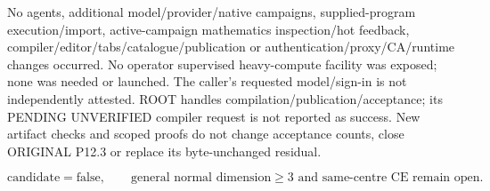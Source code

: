 No agents, additional model/provider/native campaigns, supplied-program execution/import, active-campaign mathematics inspection/hot feedback, compiler/editor/tabs/catalogue/publication or authentication/proxy/CA/runtime changes occurred. No operator supervised heavy-compute facility was exposed; none was needed or launched. The caller's requested model/sign-in is not independently attested. ROOT handles compilation/publication/acceptance; its PENDING UNVERIFIED compiler request is not reported as success. New artifact checks and scoped proofs do not change acceptance counts, close ORIGINAL P12.3 or replace its byte-unchanged residual.

\[
 \text{candidate}=\text{false},\qquad
 \text{general normal dimension}\ge3\text{ and same-centre CE remain open}.
\]

